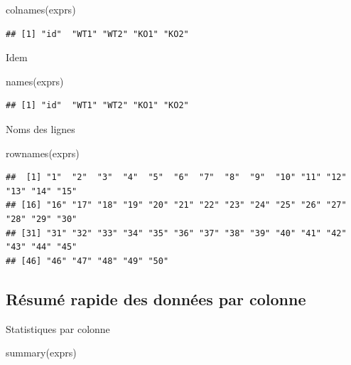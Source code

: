 \documentclass[
]{book}
\newenvironment{Shaded}{\begin{snugshade}}{\end{snugshade}}
\newcommand{\FunctionTok}[1]{\textcolor[rgb]{0.00,0.00,0.00}{#1}}
\newcommand{\NormalTok}[1]{#1}
\begin{document}
\begin{Shaded}
\begin{Highlighting}[]
\FunctionTok{colnames}\NormalTok{(exprs)}
\end{Highlighting}
\end{Shaded}

\begin{verbatim}
## [1] "id"  "WT1" "WT2" "KO1" "KO2"
\end{verbatim}

Idem

\begin{Shaded}
\begin{Highlighting}[]
\FunctionTok{names}\NormalTok{(exprs) }
\end{Highlighting}
\end{Shaded}

\begin{verbatim}
## [1] "id"  "WT1" "WT2" "KO1" "KO2"
\end{verbatim}

Noms des lignes

\begin{Shaded}
\begin{Highlighting}[]
\FunctionTok{rownames}\NormalTok{(exprs)}
\end{Highlighting}
\end{Shaded}

\begin{verbatim}
##  [1] "1"  "2"  "3"  "4"  "5"  "6"  "7"  "8"  "9"  "10" "11" "12" "13" "14" "15"
## [16] "16" "17" "18" "19" "20" "21" "22" "23" "24" "25" "26" "27" "28" "29" "30"
## [31] "31" "32" "33" "34" "35" "36" "37" "38" "39" "40" "41" "42" "43" "44" "45"
## [46] "46" "47" "48" "49" "50"
\end{verbatim}

\hypertarget{ruxe9sumuxe9-rapide-des-donnuxe9es-par-colonne}{%
\subsection{Résumé rapide des données par colonne}\label{ruxe9sumuxe9-rapide-des-donnuxe9es-par-colonne}}

Statistiques par colonne

\begin{Shaded}
\begin{Highlighting}[]
\FunctionTok{summary}\NormalTok{(exprs)}
\end{Highlighting}
\end{Shaded}
\end{document}
